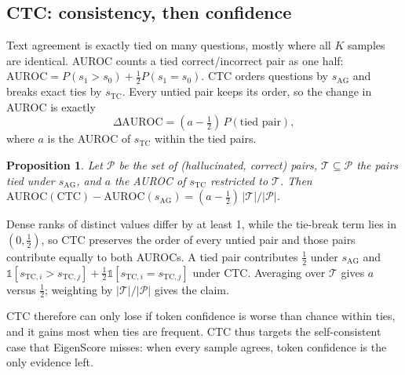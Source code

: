 \documentclass[journal]{IEEEtran}
\newtheorem{proposition}{Proposition}
\begin{document}
\subsection{CTC: consistency, then confidence}
Text agreement is exactly tied on many questions, mostly where all $K$ samples are identical. AUROC counts a tied correct/incorrect pair as one half: $\mathrm{AUROC}=P(s_1>s_0)+\tfrac12P(s_1=s_0)$. CTC orders questions by $s_{\mathrm{AG}}$ and breaks exact ties by $s_{\mathrm{TC}}$. Every untied pair keeps its order, so the change in AUROC is exactly
\begin{equation}
\Delta\mathrm{AUROC}=(a-\tfrac12)\,P(\text{tied pair}),
\end{equation}
where $a$ is the AUROC of $s_{\mathrm{TC}}$ within the tied pairs.

\begin{proposition}
Let $\mathcal{P}$ be the set of (hallucinated, correct) pairs, $\mathcal{T}\subseteq\mathcal{P}$ the pairs tied under $s_{\mathrm{AG}}$, and $a$ the AUROC of $s_{\mathrm{TC}}$ restricted to $\mathcal{T}$. Then $\mathrm{AUROC}(\mathrm{CTC})-\mathrm{AUROC}(s_{\mathrm{AG}})=(a-\tfrac12)\,|\mathcal{T}|/|\mathcal{P}|$.
\end{proposition}
\begin{IEEEproof}
Dense ranks of distinct values differ by at least 1, while the tie-break term lies in $(0,\tfrac12)$, so CTC preserves the order of every untied pair and those pairs contribute equally to both AUROCs. A tied pair contributes $\tfrac12$ under $s_{\mathrm{AG}}$ and $\mathbb{1}[s_{\mathrm{TC},i}>s_{\mathrm{TC},j}]+\tfrac12\mathbb{1}[s_{\mathrm{TC},i}=s_{\mathrm{TC},j}]$ under CTC. Averaging over $\mathcal{T}$ gives $a$ versus $\tfrac12$; weighting by $|\mathcal{T}|/|\mathcal{P}|$ gives the claim.
\end{IEEEproof}

CTC therefore can only lose if token confidence is worse than chance within ties, and it gains most when ties are frequent. CTC thus targets the self-consistent case that EigenScore misses: when every sample agrees, token confidence is the only evidence left.

\end{document}

